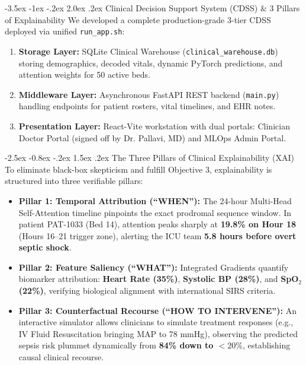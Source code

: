 \documentclass[11pt, a4paper]{article}
\makeatletter
\renewcommand\section{\@startsection {section}{1}{\z@}%
                                   {-3.5ex \@plus -1ex \@minus -.2ex}%
                                   {2.0ex \@plus.2ex}%
                                   {\normalfont\large\bfseries\color{amritaMaroon}}}
\renewcommand\subsection{\@startsection {subsection}{2}{\z@}%
                                   {-2.5ex \@plus -0.8ex \@minus -.2ex}%
                                   {1.5ex \@plus.2ex}%
                                   {\normalfont\normalsize\bfseries\color{slateNavy}}}
\makeatother
\begin{document}
\section{Clinical Decision Support System (CDSS) \& 3 Pillars of Explainability}
We developed a complete production-grade 3-tier CDSS deployed via unified \texttt{run\_app.sh}:
\begin{enumerate}
    \item \textbf{Storage Layer:} SQLite Clinical Warehouse (\texttt{clinical\_warehouse.db}) storing demographics, decoded vitals, dynamic PyTorch predictions, and attention weights for 50 active beds.
    \item \textbf{Middleware Layer:} Asynchronous FastAPI REST backend (\texttt{main.py}) handling endpoints for patient rosters, vital timelines, and EHR notes.
    \item \textbf{Presentation Layer:} React-Vite workstation with dual portals: Clinician Doctor Portal (signed off by Dr. Pallavi, MD) and MLOps Admin Portal.
\end{enumerate}

\subsection{The Three Pillars of Clinical Explainability (XAI)}
To eliminate black-box skepticism and fulfill Objective 3, explainability is structured into three verifiable pillars:
\begin{itemize}
    \item \textbf{Pillar 1: Temporal Attribution (``WHEN''):} The 24-hour Multi-Head Self-Attention timeline pinpoints the exact prodromal sequence window. In patient PAT-1033 (Bed 14), attention peaks sharply at \textbf{19.8\% on Hour 18} (Hours 16--21 trigger zone), alerting the ICU team \textbf{5.8 hours before overt septic shock}.
    \item \textbf{Pillar 2: Feature Saliency (``WHAT''):} Integrated Gradients quantify biomarker attribution: \textbf{Heart Rate (35\%)}, \textbf{Systolic BP (28\%)}, and \textbf{SpO$_2$ (22\%)}, verifying biological alignment with international SIRS criteria.
    \item \textbf{Pillar 3: Counterfactual Recourse (``HOW TO INTERVENE''):} An interactive simulator allows clinicians to simulate treatment responses (e.g., IV Fluid Resuscitation bringing MAP to 78 mmHg), observing the predicted sepsis risk plummet dynamically from \textbf{84\% down to $<20\%$}, establishing causal clinical recourse.
\end{itemize}
\end{document}
